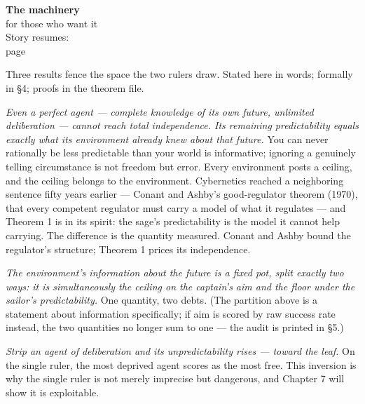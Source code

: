 \begin{machinery}{\textbf{The machinery}\\for those who want it\\[3pt]{\color{muted}Story resumes:\\page~\pageref{ch5}}}


Three results fence the space the two rulers draw. Stated here in words;
formally in §4; proofs in the theorem file.


\label{claim-0}

\noindent \emph{Even a perfect agent ---
complete knowledge of its own future, unlimited deliberation --- cannot
reach total independence. Its remaining predictability equals exactly
what its environment already knew about that future.} You can never
rationally be less predictable than your world is informative; ignoring
a genuinely telling circumstance is not freedom but error. Every
environment posts a ceiling, and the ceiling belongs to the environment. Cybernetics reached a neighboring sentence fifty years earlier --- Conant and Ashby's good-regulator theorem (1970), that every competent regulator must carry a model of what it regulates --- and Theorem 1 is in its spirit: the sage's predictability is the model it cannot help carrying. The difference is the quantity measured. Conant and Ashby bound the regulator's structure; Theorem 1 prices its independence.


\label{claim-1}

\noindent \emph{The environment's information
about the future is a fixed pot, split exactly two ways: it is
simultaneously the ceiling on the captain's aim and the floor under
the sailor's predictability.} One quantity, two debts. (The partition above is a statement about information
specifically; if aim is scored by raw success rate instead, the two
quantities no longer sum to one --- the audit is printed in §5.)


\label{claim-2}

\noindent \emph{Strip an agent of
deliberation and its unpredictability rises --- toward the leaf.} On the
single ruler, the most deprived agent scores as the most free. This
inversion is why the single ruler is not merely imprecise but dangerous,
and Chapter 7 will show it is exploitable.


\end{machinery}
